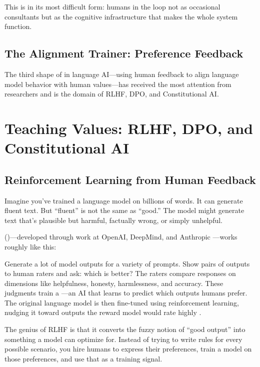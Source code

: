 This is \hitl in its most difficult form: humans in the loop not as occasional consultants but as the cognitive infrastructure that makes the whole system function.

\subsection{The Alignment Trainer: Preference Feedback}

The third shape of \hitl in language AI---using human feedback to align language model behavior with human values---has received the most attention from researchers and is the domain of RLHF, DPO, and Constitutional AI.

\section{Teaching Values: RLHF, DPO, and Constitutional AI}
\label{sec:alignment}

\subsection{Reinforcement Learning from Human Feedback}

Imagine you've trained a language model on billions of words. It can generate fluent text. But ``fluent'' is not the same as ``good.'' The model might generate text that's plausible but harmful, factually wrong, or simply unhelpful.

 ()---developed through work at OpenAI, DeepMind, and Anthropic \autocite{ouyang2022training}---works roughly like this:

Generate a lot of model outputs for a variety of prompts. Show pairs of outputs to human raters and ask: which is better? The raters compare responses on dimensions like helpfulness, honesty, harmlessness, and accuracy. These judgments train a ---an AI that learns to predict which outputs humans prefer. The original language model is then fine-tuned using reinforcement learning, nudging it toward outputs the reward model would rate highly \autocite{christiano2017deep}.

The genius of RLHF is that it converts the fuzzy notion of ``good output'' into something a model can optimize for. Instead of trying to write rules for every possible scenario, you hire humans to express their preferences, train a model on those preferences, and use that as a training signal.


